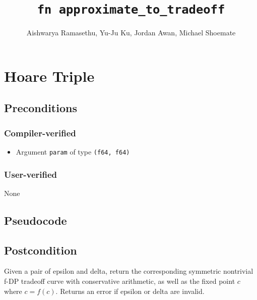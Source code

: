 \documentclass{article}
\title{\texttt{fn approximate\_to\_tradeoff}}
\author{Aishwarya Ramasethu, Yu-Ju Ku, Jordan Awan, Michael Shoemate}
\begin{document}
\maketitle

\section{Hoare Triple}

\subsection*{Preconditions}
\subsubsection*{Compiler-verified}
\begin{itemize}
    \item Argument \texttt{param} of type \texttt{(f64, f64)}
\end{itemize}

\subsubsection*{User-verified}
None

\subsection*{Pseudocode}



\subsection*{Postcondition}

\begin{theorem}
    Given a pair of epsilon and delta, return the corresponding symmetric nontrivial f-DP tradeoff curve
    with conservative arithmetic, 
    as well as the fixed point $c$ where $c = f(c)$.
    Returns an error if epsilon or delta are invalid.
\end{theorem}
\end{document}
